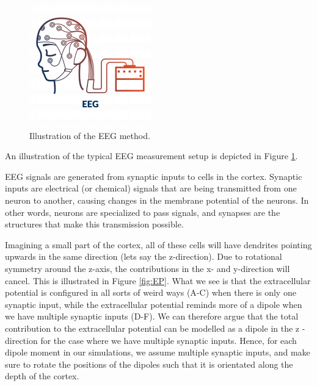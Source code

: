 \documentclass[a4paper, UKenglish, 11pt]{uiomaster}
\begin{document}
\begin{figure}
    \centering
    \includegraphics[width=\linewidth]{figures/EEG.png}
    \caption{Illustration of the EEG method.}
    \label{fig:EEG}
\end{figure}

An illustration of the typical EEG measurement setup is depicted in Figure \ref{fig:EEG}.

EEG signals are generated from synaptic inputs to cells in the cortex. Synaptic inputs are electrical (or chemical) signals that are being transmitted from one neuron to another, causing changes in the membrane potential of the neurons. In other words, neurons are specialized to pass signals, and synapses are the structures that make this transmission possible.

Imagining a small part of the cortex, all of these cells will have dendrites pointing upwards in the same direction (lets say the z-direction). Due to rotational symmetry around the z-axis, the contributions in the x- and y-direction will cancel. This is illustrated in Figure \ref{fig:EP}. What we see is that the extracellular potential is configured in all sorts of weird ways (A-C) when there is only one synaptic input, while the extracellular potential reminds more of a dipole when we have multiple synaptic inputs (D-F). We can therefore argue that the total contribution to the extracellular potential can be modelled as a dipole in the z -direction for the case where we have multiple synaptic inputs. Hence, for each dipole moment in our simulations, we assume multiple synaptic inputs, and make sure to rotate the positions of the dipoles such that it is orientated along the depth of the cortex.
\end{document}
